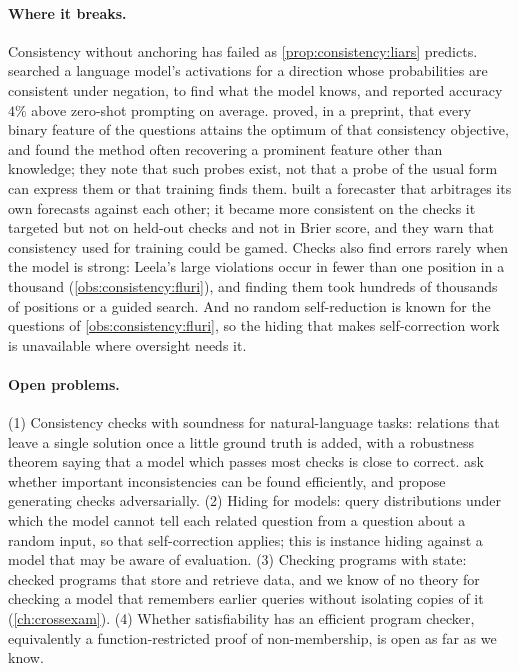 \begin{refsection}
\paragraph{Where it breaks.} Consistency without anchoring has failed as \cref{prop:consistency:liars} predicts. \Textcite{BurnsEtAl2023} searched a language model's activations for a direction whose probabilities are consistent under negation, to find what the model knows, and reported accuracy $4\%$ above zero-shot prompting on average. \Textcite{FarquharEtAl2023} proved, in a preprint, that every binary feature of the questions attains the optimum of that consistency objective, and found the method often recovering a prominent feature other than knowledge; they note that such probes exist, not that a probe of the usual form can express them or that training finds them. \Textcite{PalekaEtAl2025} built a forecaster that arbitrages its own forecasts against each other; it became more consistent on the checks it targeted but not on held-out checks and not in Brier score, and they warn that consistency used for training could be gamed. Checks also find errors rarely when the model is strong: Leela's large violations occur in fewer than one position in a thousand (\cref{obs:consistency:fluri}), and finding them took hundreds of thousands of positions or a guided search. And no random self-reduction is known for the questions of \cref{obs:consistency:fluri}, so the hiding that makes self-correction work is unavailable where oversight needs it.

\paragraph{Open problems.} (1) Consistency checks with soundness for natural-language tasks: relations that leave a single solution once a little ground truth is added, with a robustness theorem saying that a model which passes most checks is close to correct. \Textcite{FluriEtAl2024} ask whether important inconsistencies can be found efficiently, and \textcite{PalekaEtAl2025} propose generating checks adversarially. (2) Hiding for models: query distributions under which the model cannot tell each related question from a question about a random input, so that self-correction applies; this is instance hiding \parencite{BeaverFeigenbaum1990} against a model that may be aware of evaluation. (3) Checking programs with state: \textcite{BlumEtAl1994} checked programs that store and retrieve data, and we know of no theory for checking a model that remembers earlier queries without isolating copies of it (\cref{ch:crossexam}). (4) Whether satisfiability has an efficient program checker, equivalently a function-restricted proof of non-membership, is open as far as we know.


\end{refsection}

